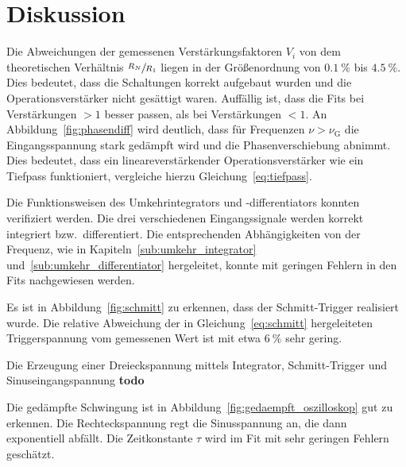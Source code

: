 \section{Diskussion}%
\label{sec:diskussion}


Die Abweichungen der gemessenen Verstärkungsfaktoren $V_i$
von dem theoretischen Verhältnis $\sfrac{R_N}{R_1}$ liegen
in der Größenordnung von $\SI{0.1}{\percent}$ bis $\SI{4.5}{\percent}$.
Dies bedeutet, dass die Schaltungen korrekt aufgebaut wurden und die Operationsverstärker nicht gesättigt waren.
Auffällig ist, dass die Fits bei Verstärkungen $> 1$ besser passen, als bei Verstärkungen $< 1$.
An Abbildung~\ref{fig:phasendiff} wird deutlich,
dass für Frequenzen $\nu > \nu_\text{G}$
die Eingangsspannung stark gedämpft wird und die Phasenverschiebung abnimmt.
Dies bedeutet, dass ein lineareverstärkender Operationsverstärker wie ein Tiefpass funktioniert, vergleiche hierzu Gleichung~\eqref{eq:tiefpass}.


Die Funktionsweisen des Umkehrintegrators und -differentiators konnten verifiziert werden.
Die drei verschiedenen Eingangssignale werden korrekt integriert bzw.\ differentiert.
Die entsprechenden Abhängigkeiten von der Frequenz, wie in Kapiteln~\ref{sub:umkehr_integrator} und~\ref{sub:umkehr_differentiator} hergeleitet,
konnte mit geringen Fehlern in den Fits nachgewiesen werden.

Es ist in Abbildung~\ref{fig:schmitt} zu erkennen,
dass der Schmitt-Trigger realisiert wurde.
Die relative Abweichung der in Gleichung~\eqref{eq:schmitt}
hergeleiteten Triggerspannung vom gemessenen Wert ist
mit etwa $\SI{6}{\percent}$ sehr gering.

Die Erzeugung einer Dreieckspannung mittels Integrator, Schmitt-Trigger und Sinuseingangspannung
\textbf{ todo }

Die gedämpfte Schwingung ist in Abbildung~\ref{fig:gedaempft_oszilloskop}
gut zu erkennen.
Die Rechteckspannung regt die Sinusspannung an,
die dann exponentiell abfällt.
Die Zeitkonstante $\tau$ wird im Fit mit sehr geringen Fehlern geschätzt.
